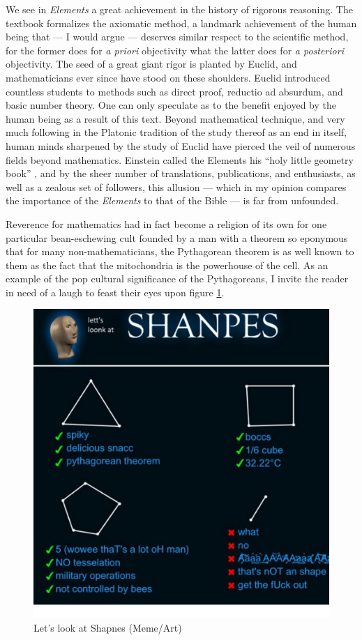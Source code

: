 \documentclass[12pt]{article}
\begin{document}
We see in \textit{Elements} a great achievement
in the history of rigorous reasoning.
The textbook formalizes the axiomatic method,
a landmark achievement of the human being that
--- I would argue ---
deserves similar respect to the scientific method,
for the former does for \textit{a priori} objectivity
what the latter does for \textit{a posteriori} objectivity.
The seed of a great giant rigor is planted by Euclid,
and mathematicians ever since have stood on these shoulders.
Euclid introduced countless students to methods such as
direct proof, reductio ad absurdum, and basic number theory.
One can only speculate as to the benefit enjoyed by
the human being as a result of this text.
Beyond mathematical technique,
and very much following in the Platonic tradition
of the study thereof as an end in itself,
human minds sharpened by the study of Euclid
have pierced the veil of numerous fields
beyond mathematics.
Einstein called the Elements
his ``holy little geometry book'' \cite{einstein},
and by the sheer number of
translations, publications, and enthusiasts,
as well as a zealous set of followers,
this allusion
--- which in my opinion compares the importance of the \textit{Elements}
to that of the Bible ---
is far from unfounded.

Reverence for mathematics had in fact
become a religion of its own
for one particular bean-eschewing
cult founded by a man with a theorem
so eponymous that for many non-mathematicians,
the Pythagorean theorem is as well known to them
as the fact that the mitochondria is the powerhouse of the cell.
As an example of the pop cultural significance of the Pythagoreans,
I invite the reader in need of a laugh to feast their eyes upon figure \ref{fig2}.


\begin{figure}
	\includegraphics[scale=0.4]{shanpes.png}
	\centering
	\caption{Let's look at Shapnes (Meme/Art) \cite{shanpes}}
	\label{fig2}
\end{figure}
\end{document}
